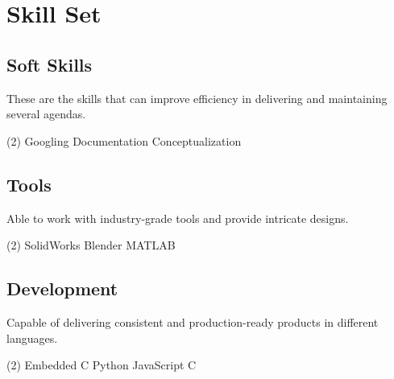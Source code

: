\section*{Skill Set}
%
%
%
\subsection*{Soft Skills}
These are the skills that can improve efficiency in delivering and maintaining several agendas.
\vspace{0mm}
\begin{tasks}(2)
  \task Googling
  \task Documentation
  \task Conceptualization
\end{tasks}
%
%
\subsection*{Tools}
Able to work with industry-grade tools and provide intricate designs.
\vspace{2mm}
\begin{tasks}(2)
  \task SolidWorks
  \task Blender
  \task MATLAB
\end{tasks}
%
%
\subsection*{Development}
Capable of delivering consistent and production-ready products in
different languages.
\vspace{2mm}
\begin{tasks}(2)
  \task Embedded C
  \task Python
  \task JavaScript
  \task C
\end{tasks}

